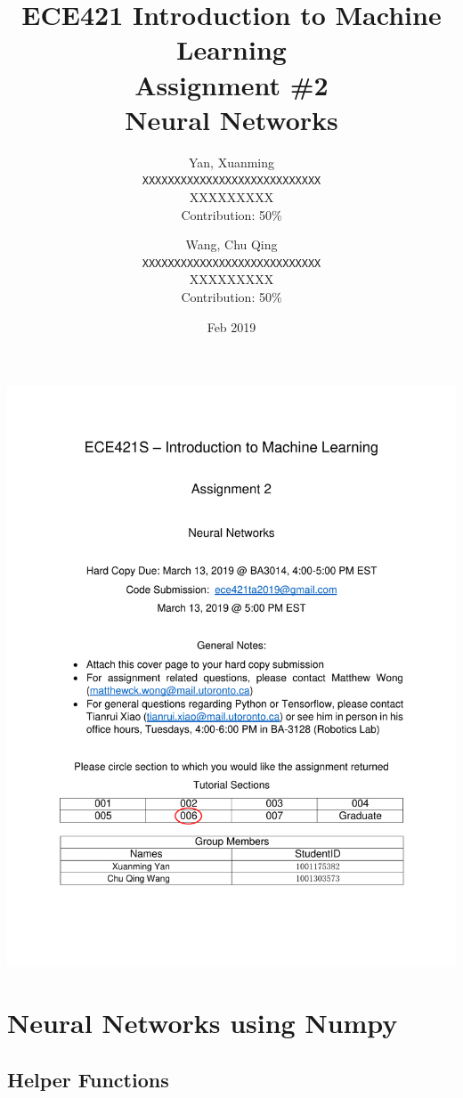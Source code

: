 \documentclass[10pt,letterpaper]{article}
\title{ECE421 Introduction to Machine Learning \\
    Assignment \#2 \\
    Neural Networks}
\date{Feb 2019}
\author{
  Yan, Xuanming\\
  \texttt{XXXXXXXXXXXXXXXXXXXXXXXXXXXX} \\
  XXXXXXXXX \\
  Contribution: 50\%
  \and
  Wang, Chu Qing\\
  \texttt{XXXXXXXXXXXXXXXXXXXXXXXXXXXX} \\
  XXXXXXXXX \\
  Contribution: 50\%
} %
\begin{document}
\includegraphics[width=1\linewidth]{a2cover.pdf}


\maketitle %


\section{Neural Networks using Numpy}


\subsection{Helper Functions}
\end{document}
